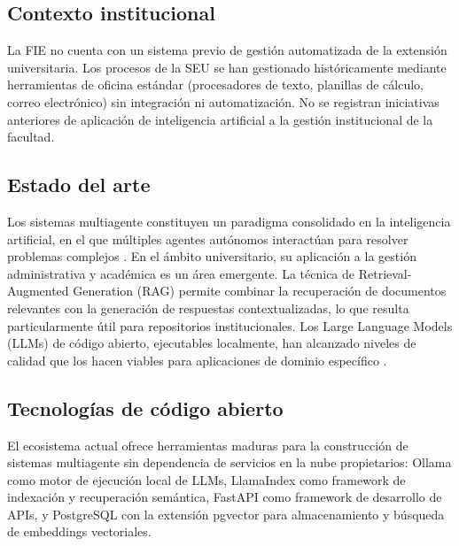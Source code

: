 \documentclass[a4paper, 12pt]{article}
\begin{document}
\subsection{Contexto institucional}

La \ac{FIE} no cuenta con un sistema previo de gesti\'on automatizada de la extensi\'on universitaria. Los procesos de la \ac{SEU} se han gestionado hist\'oricamente mediante herramientas de oficina est\'andar (procesadores de texto, planillas de c\'alculo, correo electr\'onico) sin integraci\'on ni automatizaci\'on. No se registran iniciativas anteriores de aplicaci\'on de inteligencia artificial a la gesti\'on institucional de la facultad.

\subsection{Estado del arte}

Los sistemas multiagente constituyen un paradigma consolidado en la inteligencia artificial, en el que m\'ultiples agentes aut\'onomos interact\'uan para resolver problemas complejos \parencite{wooldridge2009}. En el \'ambito universitario, su aplicaci\'on a la gesti\'on administrativa y acad\'emica es un \'area emergente. La t\'ecnica de Retrieval-Augmented Generation (RAG) \parencite{lewis2020} permite combinar la recuperaci\'on de documentos relevantes con la generaci\'on de respuestas contextualizadas, lo que resulta particularmente \'util para repositorios institucionales. Los Large Language Models (LLMs) de c\'odigo abierto, ejecutables localmente, han alcanzado niveles de calidad que los hacen viables para aplicaciones de dominio espec\'ifico \parencite{russell2021}.

\subsection{Tecnolog\'ias de c\'odigo abierto}

El ecosistema actual ofrece herramientas maduras para la construcci\'on de sistemas multiagente sin dependencia de servicios en la nube propietarios: Ollama \parencite{ollama2024} como motor de ejecuci\'on local de LLMs, LlamaIndex \parencite{llamaindex2024} como framework de indexaci\'on y recuperaci\'on sem\'antica, FastAPI \parencite{fastapi2024} como framework de desarrollo de APIs, y PostgreSQL con la extensi\'on pgvector para almacenamiento y b\'usqueda de embeddings vectoriales.

\end{document}
